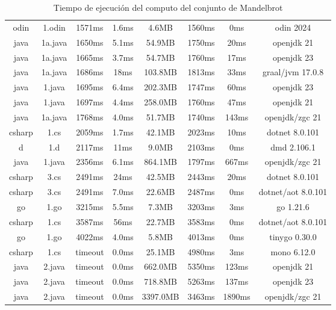 \begin{table}[H]
{\begin{tabular}{|c c c c c c c c|}
            odin    & 1.odin  & 1571ms  & 1.6ms  & 4.6MB    & 1560ms     & 0ms       & odin 2024 \\
            java    & 1a.java & 1650ms  & 5.1ms  & 54.9MB   & 1750ms     & 20ms      & openjdk 21 \\
            java    & 1a.java & 1665ms  & 3.7ms  & 54.7MB   & 1760ms     & 17ms      & openjdk 23 \\
            java    & 1a.java & 1686ms  & 18ms 	 & 103.8MB  & 1813ms     & 33ms      & graal/jvm 17.0.8 \\
            java    & 1.java  & 1695ms  & 6.4ms  & 202.3MB  & 1747ms     & 60ms      & openjdk 23 \\
            java    & 1.java  & 1697ms  & 4.4ms  & 258.0MB  & 1760ms     & 47ms      & openjdk 21 \\
            java    & 1a.java & 1768ms  & 4.0ms  & 51.7MB   & 1740ms     & 143ms     & openjdk/zgc 21 \\
            csharp  & 1.cs    & 2059ms  & 1.7ms  & 42.1MB   & 2023ms     & 10ms      & dotnet 8.0.101 \\
            d       & 1.d     & 2117ms  & 11ms 	 & 9.0MB    & 2103ms     & 0ms       & dmd 2.106.1 \\
            java    & 1.java  & 2356ms  & 6.1ms  & 864.1MB  & 1797ms     & 667ms     & openjdk/zgc 21 \\
            csharp  & 3.cs    & 2491ms  & 24ms 	 & 42.5MB   & 2443ms     & 20ms      & dotnet 8.0.101 \\
            csharp  & 3.cs    & 2491ms  & 7.0ms  & 22.6MB   & 2487ms     & 0ms       & dotnet/aot 8.0.101 \\
            go      & 1.go    & 3215ms  & 5.5ms  & 7.3MB    & 3203ms     & 3ms       & go 1.21.6 \\
            csharp  & 1.cs    & 3587ms  & 56ms 	 & 22.7MB   & 3583ms     & 0ms       & dotnet/aot 8.0.101 \\
            go      & 1.go    & 4022ms  & 4.0ms  & 5.8MB    & 4013ms     & 0ms       & tinygo 0.30.0 \\
            csharp  & 1.cs    & timeout & 0.0ms  & 25.1MB   & 4980ms     & 3ms       & mono 6.12.0 \\
            java    & 2.java  & timeout & 0.0ms  & 662.0MB  & 5350ms     & 123ms     & openjdk 21 \\
            java    & 2.java  & timeout & 0.0ms  & 718.8MB  & 5263ms     & 137ms     & openjdk 23 \\
            java    & 2.java  & timeout & 0.0ms  & 3397.0MB & 3463ms     & 1890ms    & openjdk/zgc 21  \\
            \hline
        \end{tabular}
    }
    \caption{Tiempo de ejecución del computo del conjunto de Mandelbrot \cite{languagebench}}
    \label{table:languagebench}
\end{table}

